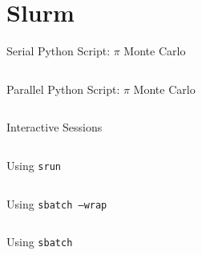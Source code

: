 \section{Slurm}

\begin{frame}{Serial Python Script: \(\pi\) Monte Carlo}
\begin{listing}[H]
\inputminted{python}{examples/slurm_tutorial/pi_monte_carlo.py}
\caption{Serial algorithm to estimate the value of Pi.}
\end{listing}
\end{frame}

\begin{frame}{Parallel Python Script: \(\pi\) Monte Carlo}
\begin{listing}[H]
\inputminted[fontsize=\tiny]{python}{examples/slurm_tutorial/pi_monte_carlo_shared.py}
\caption{Parallel algorithm to estimate the value of Pi.}
\end{listing}
\end{frame}

\begin{frame}{Interactive Sessions}
\begin{listing}[H]
\inputminted{sh}{examples/slurm_tutorial/01_interactive_session}
\caption{Using \texttt{srun} to log into a compute node to run commands interactively.}
\end{listing}
\end{frame}

\begin{frame}{Using \texttt{srun}}
\begin{listing}[H]
\inputminted{sh}{examples/slurm_tutorial/02_srun}
\caption{Using \texttt{srun} to run commands directly on a compute node.}
\end{listing}
\end{frame}

\begin{frame}{Using \texttt{sbatch --wrap}}
\begin{listing}[H]
\inputminted{sh}{examples/slurm_tutorial/03_sbatch_wrap}
\caption{Using \texttt{sbatch --wrap} wrap a commands in an \texttt{sbatch} script that is then submitted to the queue can run non-interactively.}
\end{listing}
\end{frame}

\begin{frame}{Using \texttt{sbatch}}
\begin{listing}[H]
\inputminted{sh}{examples/slurm_tutorial/04_sbatch_htc.sbatch}
\caption{Using \texttt{sbatch} run serial computations via an \texttt{sbatch} script.}
\end{listing}
\end{frame}

